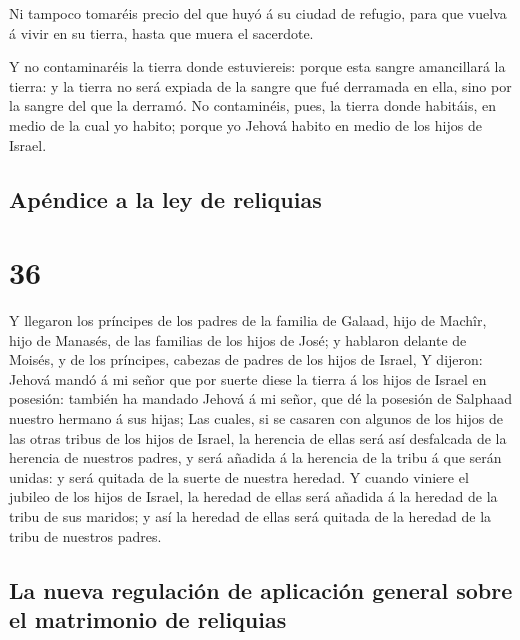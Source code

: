  Ni tampoco tomaréis precio del que huyó á su ciudad de
refugio, para que vuelva á vivir en su tierra, hasta que muera el
sacerdote.

 Y no contaminaréis la tierra donde estuviereis: porque
esta sangre amancillará la tierra: y la tierra no será expiada de la
sangre que fué derramada en ella, sino por la sangre del que la derramó.
 No contaminéis, pues, la tierra donde habitáis, en medio
de la cual yo habito; porque yo Jehová habito en medio de los hijos de
Israel.

\hypertarget{apuxe9ndice-a-la-ley-de-reliquias}{%
\subsection{Apéndice a la ley de
reliquias}\label{apuxe9ndice-a-la-ley-de-reliquias}}

\hypertarget{section-35}{%
\section{36}\label{section-35}}

 Y llegaron los príncipes de los padres de la familia de
Galaad, hijo de Machîr, hijo de Manasés, de las familias de los hijos de
José; y hablaron delante de Moisés, y de los príncipes, cabezas de
padres de los hijos de Israel,  Y dijeron: Jehová mandó á mi
señor que por suerte diese la tierra á los hijos de Israel en posesión:
también ha mandado Jehová á mi señor, que dé la posesión de Salphaad
nuestro hermano á sus hijas;  Las cuales, si se casaren con
algunos de los hijos de las otras tribus de los hijos de Israel, la
herencia de ellas será así desfalcada de la herencia de nuestros padres,
y será añadida á la herencia de la tribu á que serán unidas: y será
quitada de la suerte de nuestra heredad.  Y cuando viniere
el jubileo de los hijos de Israel, la heredad de ellas será añadida á la
heredad de la tribu de sus maridos; y así la heredad de ellas será
quitada de la heredad de la tribu de nuestros padres.

\hypertarget{la-nueva-regulaciuxf3n-de-aplicaciuxf3n-general-sobre-el-matrimonio-de-reliquias}{%
\subsection{La nueva regulación de aplicación general sobre el
matrimonio de
reliquias}\label{la-nueva-regulaciuxf3n-de-aplicaciuxf3n-general-sobre-el-matrimonio-de-reliquias}}


